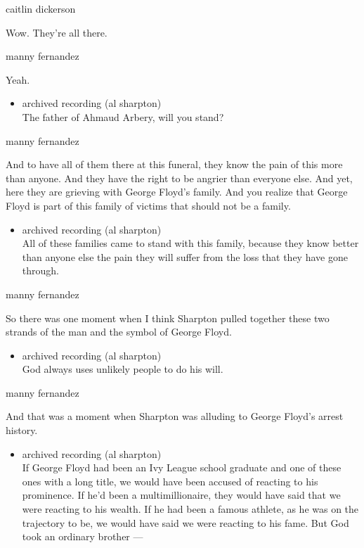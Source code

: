 caitlin dickerson

Wow. They're all there.

manny fernandez

Yeah.

\begin{itemize}
\tightlist
\item
  archived recording (al sharpton)\\
  The father of Ahmaud Arbery, will you stand?
\end{itemize}

manny fernandez

And to have all of them there at this funeral, they know the pain of
this more than anyone. And they have the right to be angrier than
everyone else. And yet, here they are grieving with George Floyd's
family. And you realize that George Floyd is part of this family of
victims that should not be a family.

\begin{itemize}
\tightlist
\item
  archived recording (al sharpton)\\
  All of these families came to stand with this family, because they
  know better than anyone else the pain they will suffer from the loss
  that they have gone through.
\end{itemize}

manny fernandez

So there was one moment when I think Sharpton pulled together these two
strands of the man and the symbol of George Floyd.

\begin{itemize}
\tightlist
\item
  archived recording (al sharpton)\\
  God always uses unlikely people to do his will.
\end{itemize}

manny fernandez

And that was a moment when Sharpton was alluding to George Floyd's
arrest history.

\begin{itemize}
\tightlist
\item
  archived recording (al sharpton)\\
  If George Floyd had been an Ivy League school graduate and one of
  these ones with a long title, we would have been accused of reacting
  to his prominence. If he'd been a multimillionaire, they would have
  said that we were reacting to his wealth. If he had been a famous
  athlete, as he was on the trajectory to be, we would have said we were
  reacting to his fame. But God took an ordinary brother ---
\end{itemize}

